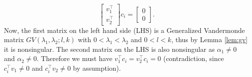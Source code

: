{\begin{pf}
\begin{equation}
	\begin{bmatrix} v_1^\top \\ v_2^\top \end{bmatrix} c_i = \begin{bmatrix} 0 \\ 0 \end{bmatrix}. \nonumber 
\end{equation}
Now, the first matrix on the left hand side (LHS) is a Generalized Vandermonde matrix $GV(\lambda_1,\lambda_2;l, k)$ with $0<\lambda_1< \lambda_2$ and $0< l<k$, thus by Lemma \ref{lem:gv} it is nonsingular. The second matrix on the LHS is also nonsingular as $\alpha_1 \neq 0$ and $\alpha_2 \neq 0$. Therefore we must have $v_1^\top c_i = v_2^\top c_i = 0$ (contradiction, since $c_i^\top v_1 \neq 0$ and $c_i^\top v_2 \neq 0$ by assumption).


\end{pf}}
